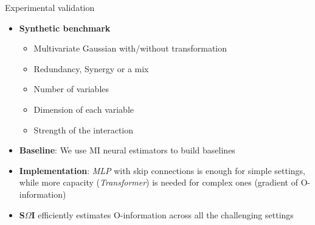 \begin{frame}{Experimental validation}
\begin{itemize}
    \item \textbf{Synthetic benchmark}
    \begin{itemize}
        \item Multivariate Gaussian with/without transformation
        \item Redundancy, Synergy or a mix
        \item Number of variables 
        \item Dimension of each variable
        \item Strength of the interaction

    \end{itemize}
    \item \textbf{Baseline}: We use MI neural estimators to build baselines
    \item \textbf{Implementation}: \textit{MLP} with skip connections is enough for simple settings, while more capacity (\textit{Transformer}) is needed for complex ones (gradient of O-information) 
    \item \textbf{S$\Omega$I} efficiently estimates O-information across all the challenging settings 
    
\end{itemize}
\end{frame}



    
            

